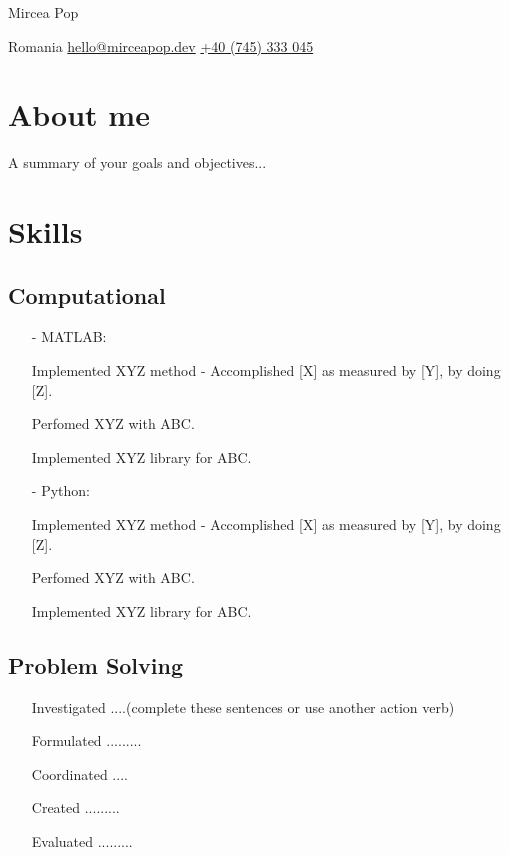 \documentclass[11pt]{article}
\begin{document}
    
    \begin{center}      
        {\fontsize{28}{28}\selectfont Mircea Pop} \\ \bigskip
    
        {\color{icnclr}\faMapMarker} Romania \quad 
        {\color{icnclr}\faEnvelope[regular]} \href{mailto:hello@mirceapop.dev}{hello@mirceapop.dev} \quad
        {\color{icnclr}} \href{tel:+40745333045}{+40 (745) 333 045} 
    \end{center}
    \section{About me}
    A summary of your goals and objectives...
   
    \section{Skills}
    \subsection{Computational}
    \begin{itemize}
        \item[-] \textcolor{Sepia}{MATLAB}:
        \item[\checkmark] Implemented XYZ method - Accomplished [X] as measured by [Y], by doing [Z].  
        \item[\checkmark] Perfomed XYZ with ABC. 
        \item[\checkmark] Implemented XYZ library for ABC. 
        \item[-] \textcolor{Sepia}{Python}: 
        \item[\checkmark] Implemented XYZ method - Accomplished [X] as measured by [Y], by doing [Z].  
        \item[\checkmark] Perfomed XYZ with ABC. 
        \item[\checkmark] Implemented XYZ library for ABC.
    \end{itemize}
    \subsection{Problem Solving}
    \begin{itemize}
        \item[\checkmark] Investigated ....(complete these sentences or use another action verb)
        \item[\checkmark] Formulated .........
        \item[\checkmark] Coordinated ....
        \item[\checkmark] Created .........
        \item[\checkmark] Evaluated .........
    \end{itemize}
\end{document}
